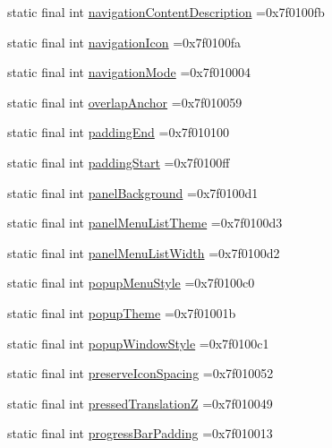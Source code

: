 \begin{DoxyCompactItemize}
\item 
static final int \hyperlink{classcheck_1_1test_1_1_r_1_1attr_a9bbeac1a500649466bdd64ac1ef20ca8}{navigation\+Content\+Description} =0x7f0100fb
\item 
static final int \hyperlink{classcheck_1_1test_1_1_r_1_1attr_a180a79b5b65a4ebfd7e0f2e70c5a231a}{navigation\+Icon} =0x7f0100fa
\item 
static final int \hyperlink{classcheck_1_1test_1_1_r_1_1attr_a6d552efd1c8cd8a467d4a5441179e7bc}{navigation\+Mode} =0x7f010004
\item 
static final int \hyperlink{classcheck_1_1test_1_1_r_1_1attr_a0ff108aa79d1ca5503c46fa0b941870e}{overlap\+Anchor} =0x7f010059
\item 
static final int \hyperlink{classcheck_1_1test_1_1_r_1_1attr_a3817ccbc2ce29aa2aedb06d9517a49d0}{padding\+End} =0x7f010100
\item 
static final int \hyperlink{classcheck_1_1test_1_1_r_1_1attr_a1e5a8103a877312cb676b708423cc823}{padding\+Start} =0x7f0100ff
\item 
static final int \hyperlink{classcheck_1_1test_1_1_r_1_1attr_a67199b3cdfd107c7f6b17e7083ccff84}{panel\+Background} =0x7f0100d1
\item 
static final int \hyperlink{classcheck_1_1test_1_1_r_1_1attr_a6f31f89058cb2734f29f1bb7913c05db}{panel\+Menu\+List\+Theme} =0x7f0100d3
\item 
static final int \hyperlink{classcheck_1_1test_1_1_r_1_1attr_af36f49eda2d47bd95cb2012376a0547d}{panel\+Menu\+List\+Width} =0x7f0100d2
\item 
static final int \hyperlink{classcheck_1_1test_1_1_r_1_1attr_aba44c089874abc974a6e8827efcd53ea}{popup\+Menu\+Style} =0x7f0100c0
\item 
static final int \hyperlink{classcheck_1_1test_1_1_r_1_1attr_a80b43c587b8929227394e17102b18eb4}{popup\+Theme} =0x7f01001b
\item 
static final int \hyperlink{classcheck_1_1test_1_1_r_1_1attr_a0ec5c2b453be6a2be04aa78dce81d0b6}{popup\+Window\+Style} =0x7f0100c1
\item 
static final int \hyperlink{classcheck_1_1test_1_1_r_1_1attr_ae85e01112339734f60777fb376eb7e67}{preserve\+Icon\+Spacing} =0x7f010052
\item 
static final int \hyperlink{classcheck_1_1test_1_1_r_1_1attr_a7e7386a063e1333f5af03bd54faff84f}{pressed\+Translation\+Z} =0x7f010049
\item 
static final int \hyperlink{classcheck_1_1test_1_1_r_1_1attr_a48d0f556721f22983ce0941643a36463}{progress\+Bar\+Padding} =0x7f010013

\end{DoxyCompactItemize}
